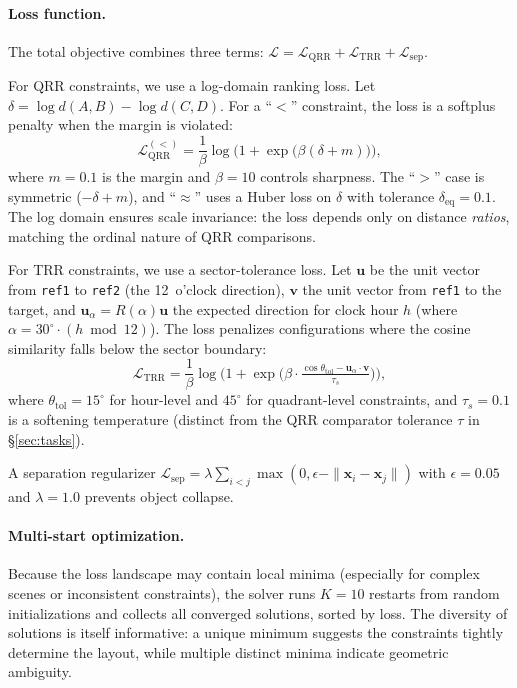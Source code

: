 \paragraph{Loss function.}
The total objective combines three terms: $\mathcal{L} = \mathcal{L}_{\mathrm{QRR}} + \mathcal{L}_{\mathrm{TRR}} + \mathcal{L}_{\mathrm{sep}}$.

For QRR constraints, we use a log-domain ranking loss. Let $\delta = \log d(A,B) - \log d(C,D)$. For a ``$<$'' constraint, the loss is a softplus penalty when the margin is violated:
\begin{equation}
  \mathcal{L}_{\mathrm{QRR}}^{(<)} = \frac{1}{\beta}\log\bigl(1 + \exp\bigl(\beta(\delta + m)\bigr)\bigr),
  \label{eq:qrr-loss}
\end{equation}
where $m = 0.1$ is the margin and $\beta = 10$ controls sharpness. The ``$>$'' case is symmetric ($-\delta + m$), and ``$\approx$'' uses a Huber loss on $\delta$ with tolerance $\delta_{\mathrm{eq}} = 0.1$. The log domain ensures scale invariance: the loss depends only on distance \emph{ratios}, matching the ordinal nature of QRR comparisons.

For TRR constraints, we use a sector-tolerance loss. Let $\mathbf{u}$ be the unit vector from \texttt{ref1} to \texttt{ref2} (the 12~o'clock direction), $\mathbf{v}$ the unit vector from \texttt{ref1} to the target, and $\mathbf{u}_\alpha = R(\alpha)\mathbf{u}$ the expected direction for clock hour $h$ (where $\alpha = 30^\circ \cdot (h \bmod 12)$). The loss penalizes configurations where the cosine similarity falls below the sector boundary:
\begin{equation}
  \mathcal{L}_{\mathrm{TRR}} = \frac{1}{\beta}\log\bigl(1 + \exp\bigl(\beta \cdot \tfrac{\cos\theta_{\mathrm{tol}} - \mathbf{u}_\alpha \cdot \mathbf{v}}{\tau_s}\bigr)\bigr),
  \label{eq:trr-loss}
\end{equation}
where $\theta_{\mathrm{tol}} = 15^\circ$ for hour-level and $45^\circ$ for quadrant-level constraints, and $\tau_s = 0.1$ is a softening temperature (distinct from the QRR comparator tolerance $\tau$ in \S\ref{sec:tasks}).

A separation regularizer $\mathcal{L}_{\mathrm{sep}} = \lambda \sum_{i < j} \max(0, \epsilon - \|\mathbf{x}_i - \mathbf{x}_j\|)$ with $\epsilon = 0.05$ and $\lambda = 1.0$ prevents object collapse.

\paragraph{Multi-start optimization.}
Because the loss landscape may contain local minima (especially for complex scenes or inconsistent constraints), the solver runs $K = 10$ restarts from random initializations and collects all converged solutions, sorted by loss. The diversity of solutions is itself informative: a unique minimum suggests the constraints tightly determine the layout, while multiple distinct minima indicate geometric ambiguity.

